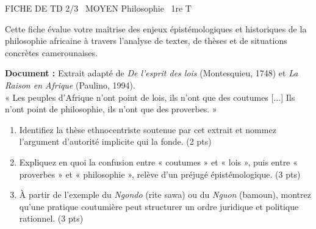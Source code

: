 \documentclass[11pt]{article}
\begin{document}
\begin{tcolorbox}[enhanced,colback=popink,colframe=popink,arc=10pt,boxrule=0pt,left=12pt,right=12pt,top=9pt,bottom=9pt]
{\color{white}\popxbold\small FICHE DE TD 2/3 \textbullet\ MOYEN \hfill Philosophie \textbullet\ 1re T\par}
\end{tcolorbox}
\vspace{4pt}
\noindent Cette fiche évalue votre maîtrise des enjeux épistémologiques et historiques de la philosophie africaine à travers l'analyse de textes, de thèses et de situations concrètes camerounaises.

\begin{exercice}
\textbf{Document :} Extrait adapté de \textit{De l'esprit des lois} (Montesquieu, 1748) et \textit{La Raison en Afrique} (Paulino, 1994).\\
« Les peuples d'Afrique n'ont point de lois, ils n'ont que des coutumes [...] Ils n'ont point de philosophie, ils n'ont que des proverbes. »
\begin{enumerate}
    \item Identifiez la thèse ethnocentriste soutenue par cet extrait et nommez l'argument d'autorité implicite qui la fonde. (2 pts)
    \item Expliquez en quoi la confusion entre « coutumes » et « lois », puis entre « proverbes » et « philosophie », relève d'un préjugé épistémologique. (3 pts)
    \item À partir de l'exemple du \textit{Ngondo} (rite sawa) ou du \textit{Nguon} (bamoun), montrez qu'une pratique coutumière peut structurer un ordre juridique et politique rationnel. (3 pts)
\end{enumerate}
\end{exercice}
\end{document}
